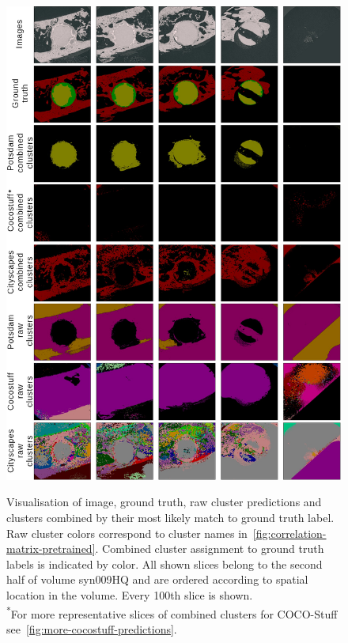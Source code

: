 \begin{figure}[p]
    \centering
    \includegraphics[width=\textwidth]{pictures/experiment_1/pretrained-models_cluster-predictions_example_predictions_2_small}\\
    \caption[Example Predictions from Provided Models]{Visualisation of image, ground truth, raw cluster predictions and clusters combined by their most likely match to ground truth label. Raw cluster colors correspond to cluster names in~\autoref{fig:correlation-matrix-pretrained}. Combined cluster assignment to ground truth labels is indicated by color. All shown slices belong to the second half of volume syn009HQ and are ordered according to spatial location in the volume. Every 100th slice is shown.
    \\ \textsuperscript{*}For more representative slices of combined clusters for COCO-Stuff see~\autoref{fig:more-cocostuff-predictions}.}
    \label{fig:pretrained-predictions}
\end{figure}

